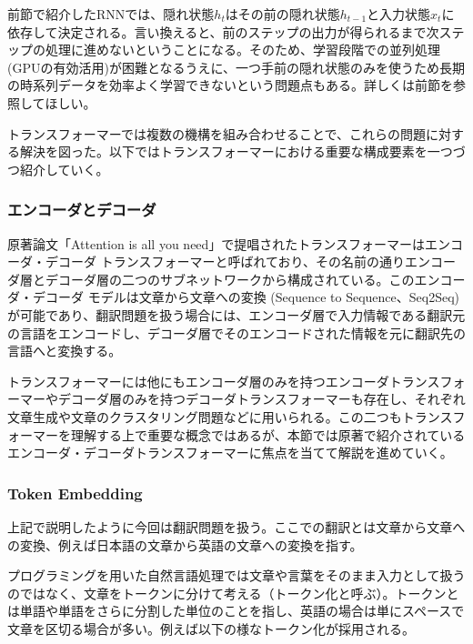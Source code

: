 
前節で紹介したRNNでは、隠れ状態$h_t$はその前の隠れ状態$h_{t-1}$と入力状態$x_t$に依存して決定される。言い換えると、前のステップの出力が得られるまで次ステップの処理に進めないということになる。そのため、学習段階での並列処理(GPUの有効活用)が困難となるうえに、一つ手前の隠れ状態のみを使うため長期の時系列データを効率よく学習できないという問題点もある。詳しくは前節を参照してほしい。



トランスフォーマーでは複数の機構を組み合わせることで、これらの問題に対する解決を図った。以下ではトランスフォーマーにおける重要な構成要素を一つづつ紹介していく。



\subsubsection{エンコーダとデコーダ}
原著論文「Attention is all you need」で提唱されたトランスフォーマーはエンコーダ・デコーダ トランスフォーマーと呼ばれており、その名前の通りエンコーダ層とデコーダ層の二つのサブネットワークから構成されている。このエンコーダ・デコーダ モデルは文章から文章への変換 (Sequence to Sequence、Seq2Seq)が可能であり、翻訳問題を扱う場合には、エンコーダ層で入力情報である翻訳元の言語をエンコードし、デコーダ層でそのエンコードされた情報を元に翻訳先の言語へと変換する。

トランスフォーマーには他にもエンコーダ層のみを持つエンコーダトランスフォーマーやデコーダ層のみを持つデコーダトランスフォーマーも存在し、それぞれ文章生成や文章のクラスタリング問題などに用いられる。この二つもトランスフォーマーを理解する上で重要な概念ではあるが、本節では原著で紹介されているエンコーダ・デコーダトランスフォーマーに焦点を当てて解説を進めていく。


\subsubsection{Token Embedding}
上記で説明したように今回は翻訳問題を扱う。ここでの翻訳とは文章から文章への変換、例えば日本語の文章から英語の文章への変換を指す。

プログラミングを用いた自然言語処理では文章や言葉をそのまま入力として扱うのではなく、文章をトークンに分けて考える（トークン化と呼ぶ）。トークンとは単語や単語をさらに分割した単位のことを指し、英語の場合は単にスペースで文章を区切る場合が多い。例えば以下の様なトークン化が採用される。


